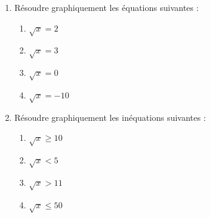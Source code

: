 \documentclass[a4paper]{article}
\begin{document}
\begin{enumerate}
  \item Résoudre graphiquement les équations suivantes :
    \begin{multicols}{4}
      \begin{enumerate}
	\item $\sqrt{x}=2$
	\item $\sqrt{x}=3$
	\item $\sqrt{x}=0$
	\item $\sqrt{x}=-10$
      \end{enumerate}
    \end{multicols}
    \item Résoudre graphiquement les inéquations suivantes :
    \begin{multicols}{4}
      \begin{enumerate}
	\item $\sqrt{x}\geq 10$
	\item $\sqrt{x}<5$
	\item $\sqrt{x}>11$
	\item $\sqrt{x}\leq 50$
      \end{enumerate}
    \end{multicols}
\end{enumerate}
\end{document}

